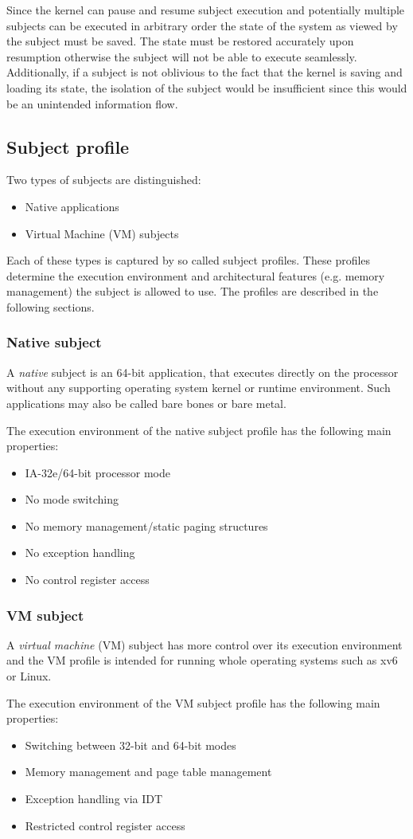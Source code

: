 Since the kernel can pause and resume subject execution and potentially multiple
subjects can be executed in arbitrary order the state of the system as viewed by
the subject must be saved. The state must be restored accurately upon resumption
otherwise the subject will not be able to execute seamlessly. Additionally, if a
subject is not oblivious to the fact that the kernel is saving and loading its
state, the isolation of the subject would be insufficient since this would be an
unintended information flow.

\subsection{Subject profile}
Two types of subjects are distinguished:

\begin{itemize}
	\item Native applications
	\item Virtual Machine (VM) subjects
\end{itemize}

Each of these types is captured by so called subject profiles. These profiles
determine the execution environment and architectural features (e.g. memory
management) the subject is allowed to use. The profiles are described in the
following sections.

\subsubsection{Native subject}
A \emph{native} subject is an 64-bit application, that executes directly on the
processor without any supporting operating system kernel or runtime environment.
Such applications may also be called bare bones or bare metal.

The execution environment of the native subject profile has the following main
properties:

\begin{itemize}
	\item IA-32e/64-bit processor mode
	\item No mode switching
	\item No memory management/static paging structures
	\item No exception handling
	\item No control register access
\end{itemize}

\subsubsection{VM subject}
A \emph{virtual machine} (VM) subject has more control over its execution
environment and the VM profile is intended for running whole operating systems
such as xv6 or Linux.

The execution environment of the VM subject profile has the following main
properties:

\begin{itemize}
	\item Switching between 32-bit and 64-bit modes
	\item Memory management and page table management
	\item Exception handling via IDT
	\item Restricted control register access
\end{itemize}
